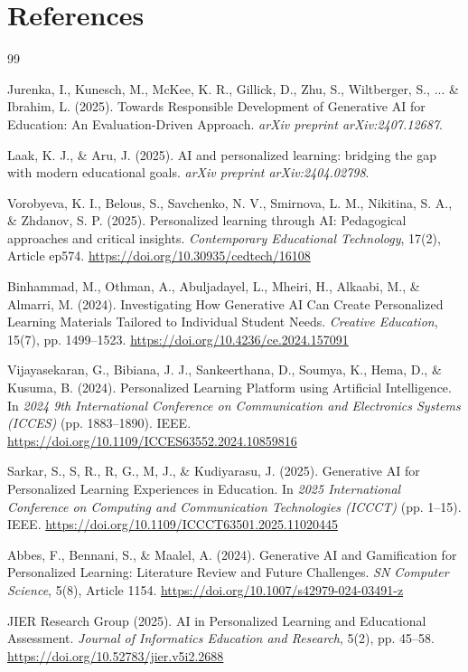 \documentclass[final,5p,times,twocolumn,authoryear]{elsarticle}
\begin{document}
\section*{References}
\begin{thebibliography}{99}

Jurenka, I., Kunesch, M., McKee, K. R., Gillick, D., Zhu, S., Wiltberger, S., ... \& Ibrahim, L. (2025). Towards Responsible Development of Generative AI for Education: An Evaluation-Driven Approach. \textit{arXiv preprint arXiv:2407.12687}.

Laak, K. J., \& Aru, J. (2025). AI and personalized learning: bridging the gap with modern educational goals. \textit{arXiv preprint arXiv:2404.02798}.

Vorobyeva, K. I., Belous, S., Savchenko, N. V., Smirnova, L. M., Nikitina, S. A., \& Zhdanov, S. P. (2025). Personalized learning through AI: Pedagogical approaches and critical insights. \textit{Contemporary Educational Technology}, 17(2), Article ep574. \url{https://doi.org/10.30935/cedtech/16108}

Binhammad, M., Othman, A., Abuljadayel, L., Mheiri, H., Alkaabi, M., \& Almarri, M. (2024). Investigating How Generative AI Can Create Personalized Learning Materials Tailored to Individual Student Needs. \textit{Creative Education}, 15(7), pp. 1499--1523. \url{https://doi.org/10.4236/ce.2024.157091}

Vijayasekaran, G., Bibiana, J. J., Sankeerthana, D., Soumya, K., Hema, D., \& Kusuma, B. (2024). Personalized Learning Platform using Artificial Intelligence. In \textit{2024 9th International Conference on Communication and Electronics Systems (ICCES)} (pp. 1883--1890). IEEE. \url{https://doi.org/10.1109/ICCES63552.2024.10859816}

Sarkar, S., S, R., R, G., M, J., \& Kudiyarasu, J. (2025). Generative AI for Personalized Learning Experiences in Education. In \textit{2025 International Conference on Computing and Communication Technologies (ICCCT)} (pp. 1--15). IEEE. \url{https://doi.org/10.1109/ICCCT63501.2025.11020445}

Abbes, F., Bennani, S., \& Maalel, A. (2024). Generative AI and Gamification for Personalized Learning: Literature Review and Future Challenges. \textit{SN Computer Science}, 5(8), Article 1154. \url{https://doi.org/10.1007/s42979-024-03491-z}

JIER Research Group (2025). AI in Personalized Learning and Educational Assessment. \textit{Journal of Informatics Education and Research}, 5(2), pp. 45--58. \url{https://doi.org/10.52783/jier.v5i2.2688}


\end{thebibliography}
\end{document}
